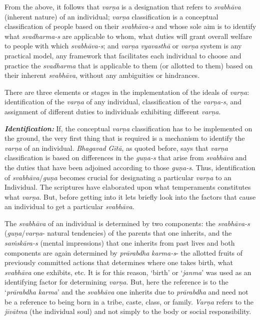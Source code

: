 From the above, it follows that \emph{varṇa} is a designation that refers to \emph{svabhāva} (inherent nature) of an individual; \emph{varṇa} classification is a conceptual classification of people based on their \emph{svabhāva-s} and whose sole aim is to identify what \emph{svadharma-s} are applicable to whom, what duties will grant overall welfare to people with which \emph{svabhāva-s}; and \emph{varṇa} \emph{vyavasthā} or \emph{varṇa} system is any practical model, any framework that facilitates each individual to choose and practice the \emph{svadharma} that is applicable to them (or allotted to them) based on their inherent \emph{svabhāva}, without any ambiguities or hindrances.

There are three elements or stages in the implementation of the ideals of \emph{varṇa}: identification of the \emph{varṇa} of any individual, classification of the \emph{varṇa-s}, and assignment of different duties to individuals exhibiting different \emph{varṇa}.

\emph{\textbf{Identification:}} If, the conceptual \emph{varṇa} classification has to be implemented on the ground, the very first thing that is required is a mechanism to identify the \emph{varṇa} of an individual. \emph{Bhagavad} \emph{Gītā}, as quoted before, says that \emph{varṇa} classification is based on differences in the \emph{guṇa-s} that arise from \emph{svabhāva} and the duties that have been adjoined according to those \emph{guṇa-s}. Thus, identification of \emph{svabhāva}/\emph{guṇa} becomes crucial for designating a particular \emph{varṇa} to an Individual. The scriptures have elaborated upon what temperaments constitutes what \emph{varṇa}. But, before getting into it lets briefly look into the factors that cause an individual to get a particular \emph{svabhāva}.

The \emph{svabhāva} of an individual is determined by two components: the \emph{svabhāva-s} (\emph{guṇa}/\emph{varṇa}- natural tendencies) of the parents that one inherits, and the \emph{saṁskāra-s} (mental impressions) that one inherits from past lives and both components are again determined by \emph{prārabdha} \emph{karma-s}- the allotted fruits of previously committed actions that determines where one takes birth, what \emph{svabhāva} one exhibits, etc. It is for this reason, `birth' or `\emph{janma}' was used as an identifying factor for determining \emph{varṇa}. But, here the reference is to the `\emph{prārabdha} \emph{karma}' and the \emph{svabhāva} one inherits due to \emph{prārabdha} and need not be a reference to being born in a tribe, caste, class, or family. \emph{Varṇa} refers to the \emph{jīvātma} (the individual soul) and not simply to the body or social responsibility.

